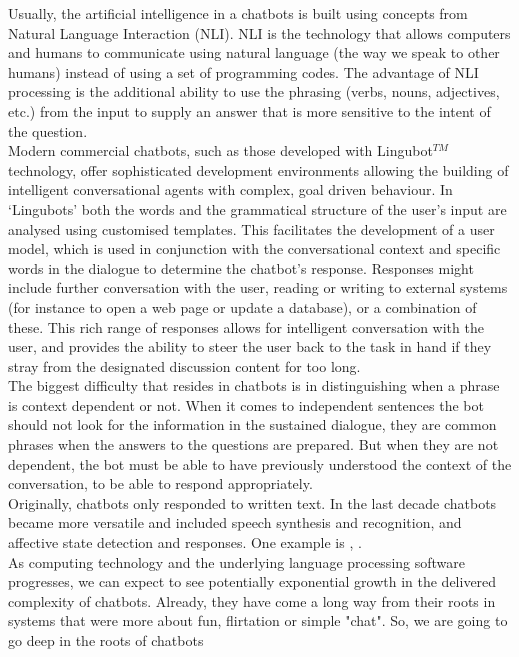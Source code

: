 \documentclass[12pt,twoside]{article}
\theoremstyle{plain}
\theoremstyle{definition}
\theoremstyle{remark}
\begin{document}
 Usually, the artificial intelligence in a chatbots is built using concepts from Natural Language Interaction (NLI). NLI is the technology that allows computers and humans to communicate using natural language (the way we speak to other humans) instead of using a set of programming codes. The advantage of NLI processing is the additional ability to use the phrasing (verbs, nouns, adjectives, etc.) from the input to supply an answer that is more sensitive to the intent of the question.\\
 
 Modern commercial chatbots, such as those developed with Lingubot$^{TM}$ \cite{lingubot2004creative} technology, offer sophisticated development environments allowing the building of intelligent conversational agents with complex, goal driven behaviour. In ‘Lingubots’ both the words and the grammatical structure of the user’s input are analysed using customised templates. This facilitates the development of a user model, which is used in conjunction with the conversational context and specific words in the dialogue to determine the chatbot’s response. Responses might include further conversation with the user, reading or writing to external systems (for instance to open a web page or update a database), or a combination of these. This rich range of responses allows for intelligent conversation with the user, and provides the ability to steer the user back to the task in hand if they stray from the designated discussion content for too long.  \\
 
The biggest difficulty that resides in chatbots is in distinguishing when a phrase is context dependent or not. When it comes to independent sentences the bot should not look for the information in the sustained dialogue, they are common phrases when the answers to the questions are prepared. But when they are not dependent, the bot must be able to have previously understood the context of the conversation, to be able to respond appropriately.\\
 
	 Originally, chatbots only responded to written text. In the last decade chatbots became more versatile and included speech synthesis and recognition,
and affective state detection and responses. One example is ,\cite{curry2012implementation} .\\


As computing technology and the underlying language processing software progresses, we can expect to see potentially exponential growth in the delivered complexity of chatbots. Already, they have come a long way from their roots in systems that were more about fun, flirtation or simple "chat". So, we are going to go deep in the roots of chatbots\\
 
\end{document}
